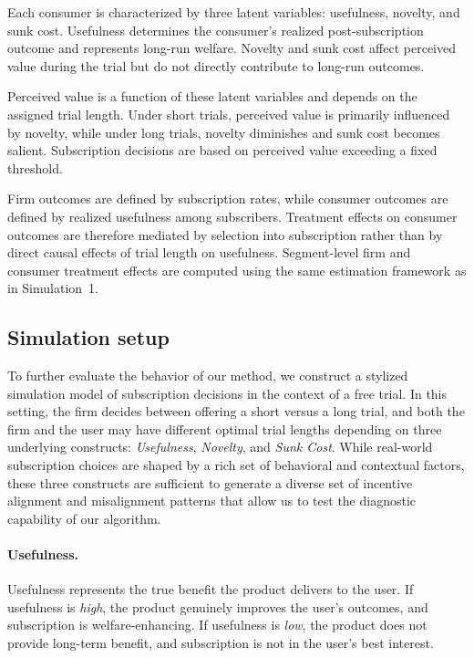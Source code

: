 \documentclass[11pt,letterpaper,english]{article}
\theoremstyle{definition}
\theoremstyle{definition}
\begin{document}
\begin{bibunit}
Each consumer is characterized by three latent variables: usefulness, novelty, and sunk cost. Usefulness determines the consumer’s realized post-subscription outcome and represents long-run welfare. Novelty and sunk cost affect perceived value during the trial but do not directly contribute to long-run outcomes.

Perceived value is a function of these latent variables and depends on the assigned trial length. Under short trials, perceived value is primarily influenced by novelty, while under long trials, novelty diminishes and sunk cost becomes salient. Subscription decisions are based on perceived value exceeding a fixed threshold.

Firm outcomes are defined by subscription rates, while consumer outcomes are defined by realized usefulness among subscribers. Treatment effects on consumer outcomes are therefore mediated by selection into subscription rather than by direct causal effects of trial length on usefulness. Segment-level firm and consumer treatment effects are computed using the same estimation framework as in Simulation~1.



\subsection{Simulation setup}
\label{sec:simulation-setup}

To further evaluate the behavior of our method, we construct a stylized simulation model of subscription decisions in the context of a free trial. In this setting, the firm decides between offering a short versus a long trial, and both the firm and the user may have different optimal trial lengths depending on three underlying constructs: \emph{Usefulness}, \emph{Novelty}, and \emph{Sunk Cost}. While real-world subscription choices are shaped by a rich set of behavioral and contextual factors, these three constructs are sufficient to generate a diverse set of incentive alignment and misalignment patterns that allow us to test the diagnostic capability of our algorithm.

\paragraph{Usefulness.} Usefulness represents the true benefit the product delivers to the user. If usefulness is \emph{high}, the product genuinely improves the user's outcomes, and subscription is welfare-enhancing. If usefulness is \emph{low}, the product does not provide long-term benefit, and subscription is not in the user’s best interest.


\end{bibunit}
\end{document}
